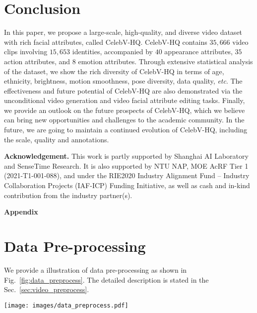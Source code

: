 \documentclass[runningheads]{llncs}
\begin{document}
\section{Conclusion}

In this paper, we propose a large-scale, high-quality, and diverse video dataset with rich facial attributes, called CelebV-HQ. CelebV-HQ contains $35,666$ video clips involving $15,653$ identities, accompanied by $40$ appearance attributes, $35$ action attributes, and $8$ emotion attributes.
Through extensive statistical analysis of the dataset, we show the rich diversity of CelebV-HQ in terms of age, ethnicity, brightness, motion smoothness, pose diversity, data quality, \textit{etc}.
The effectiveness and future potential of CelebV-HQ are also demonstrated via the unconditional video generation and video facial attribute editing tasks. 
Finally, we provide an outlook on the future prospects of CelebV-HQ, which we believe can bring new opportunities and challenges to the academic community. In the future, we are going to maintain a continued evolution of CelebV-HQ, including the scale, quality and annotations.

\noindent
\textbf{Acknowledgement.} This work is partly supported by Shanghai AI Laboratory and SenseTime Research. It is also supported by NTU NAP, MOE AcRF Tier 1 (2021-T1-001-088), and under the RIE2020 Industry Alignment Fund – Industry Collaboration Projects (IAF-ICP) Funding Initiative, as well as cash and in-kind contribution from the industry partner(s).


{\small


}



\clearpage
\appendix


\noindent
\textbf{\LARGE Appendix}


\setcounter{table}{0}
\renewcommand{\thetable}{A\arabic{table}}
\setcounter{figure}{0}
\renewcommand{\thefigure}{A\arabic{figure}}



\section{Data Pre-processing}
\label{appsec:video_preprocess}
We provide a illustration of data pre-processing as shown in Fig.~\ref{fig:data_preprocess}. The detailed description is stated in the Sec.~\ref{sec:video_preprocess}. 

\begin{figure*}[h]
\centering
\texttt{[image: images/data\_preprocess.pdf]}
\caption{\textbf{Pipeline of data pre-process} (a) We start from the bounding box detection for each frame. (b) A tracking framework~\cite{sort} is introduced to track different identities. (c) Given bounding box sequences (\textcolor{orange}{dotted orange boxes}), we calculate their minimum bounding rectangles (\textcolor{blue}{blue box}). If bounding rectangles smaller than 512$\times$512, we expand it to this size (\textcolor{red}{red box}). (d) Finally, the videos are cropped using the bounding rectangles (blue/red boxes).  }
\label{fig:data_preprocess}
\end{figure*}
\end{document}
